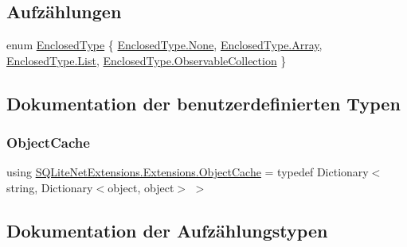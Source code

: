 \subsection*{Aufzählungen}
\begin{DoxyCompactItemize}
\item 
enum \mbox{\hyperlink{namespace_s_q_lite_net_extensions_1_1_extensions_aace11eca8565821a25238868e3b0e64b}{Enclosed\+Type}} \{ \mbox{\hyperlink{namespace_s_q_lite_net_extensions_1_1_extensions_aace11eca8565821a25238868e3b0e64ba6adf97f83acf6453d4a6a4b1070f3754}{Enclosed\+Type.\+None}}, 
\mbox{\hyperlink{namespace_s_q_lite_net_extensions_1_1_extensions_aace11eca8565821a25238868e3b0e64ba4410ec34d9e6c1a68100ca0ce033fb17}{Enclosed\+Type.\+Array}}, 
\mbox{\hyperlink{namespace_s_q_lite_net_extensions_1_1_extensions_aace11eca8565821a25238868e3b0e64ba4ee29ca12c7d126654bd0e5275de6135}{Enclosed\+Type.\+List}}, 
\mbox{\hyperlink{namespace_s_q_lite_net_extensions_1_1_extensions_aace11eca8565821a25238868e3b0e64ba8cada02ca8b4adf48cd02bb0ab3f7969}{Enclosed\+Type.\+Observable\+Collection}}
 \}
\end{DoxyCompactItemize}


\subsection{Dokumentation der benutzerdefinierten Typen}
\mbox{\label{namespace_s_q_lite_net_extensions_1_1_extensions_a0d74ade80ea1c5d2d5e7d9caa003bf00}} 
\subsubsection{\texorpdfstring{Object\+Cache}{ObjectCache}}
{\footnotesize\ttfamily using \mbox{\hyperlink{namespace_s_q_lite_net_extensions_1_1_extensions_a0d74ade80ea1c5d2d5e7d9caa003bf00}{S\+Q\+Lite\+Net\+Extensions.\+Extensions.\+Object\+Cache}} = typedef Dictionary$<$string, Dictionary$<$object, object$>$ $>$}



\subsection{Dokumentation der Aufzählungstypen}
\mbox{\label{namespace_s_q_lite_net_extensions_1_1_extensions_aace11eca8565821a25238868e3b0e64b}} 
